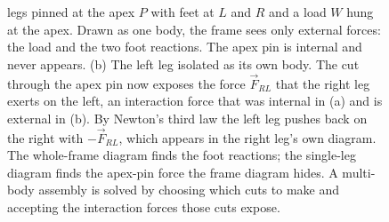 \begin{figure}[htbp]
{legs pinned at the apex $P$ with feet at $L$ and $R$ and a load $W$ hung at
the apex. Drawn as one body, the frame sees only external forces: the load
and the two foot reactions. The apex pin is internal and never appears. (b)
The left leg isolated as its own body. The cut through the apex pin now
exposes the force $\vec{F}_{RL}$ that the right leg exerts on the left, an
interaction force that was internal in (a) and is external in (b). By
Newton's third law the left leg pushes back on the right with $-\vec{F}_{RL}$,
which appears in the right leg's own diagram. The whole-frame diagram finds
the foot reactions; the single-leg diagram finds the apex-pin force the frame
diagram hides. A multi-body assembly is solved by choosing which cuts to make
and accepting the interaction forces those cuts expose.}
\label{fig:vol03ch01:a-frame}
\end{figure}
